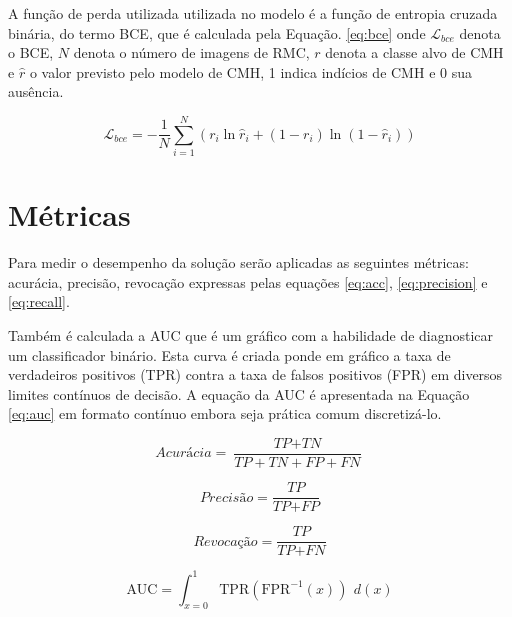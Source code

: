 A função de perda utilizada utilizada no modelo é a função de entropia cruzada binária, do termo  \gls{BCE}, que é calculada pela Equação. \ref{eq:bce} onde $\mathcal{L}_{bce}$ denota o \gls{BCE}, $N$ denota o número de imagens de \gls{RMC}, $r$ denota a classe alvo de \gls{CMH} e $\hat{r}$ o valor previsto pelo modelo de \gls{CMH}, 1 indica indícios de \gls{CMH} e 0 sua ausência.

\begin{equation}
\mathcal{L}_{bce} = -\frac{1}{N} \sum_{i=1}^N
(r_i \ln \hat{r}_i + (1 - r_i) \ln (1 - \hat{r}_i))
\label{eq:bce}
\end{equation}

\section{Métricas}
\label{subsec:cap4_metrics}
Para medir o desempenho da solução serão aplicadas as seguintes métricas: acurácia, precisão, revocação expressas pelas equações \ref{eq:acc}, \ref{eq:precision} e \ref{eq:recall}.

Também é calculada a \gls{AUC} que é um gráfico com a habilidade de diagnosticar um classificador binário. Esta curva é criada ponde em gráfico a taxa de verdadeiros positivos (TPR) contra a taxa de falsos positivos (FPR) em diversos limites contínuos de decisão. A equação da \gls{AUC} é apresentada na Equação \ref{eq:auc} em formato contínuo embora seja prática comum discretizá-lo.


\begin{equation}
  \textit{Acurácia} = \frac{\textit{TP} + \textit{TN}}{\textit{TP} + \textit{TN} + \textit{FP} + \textit{FN}}
  \label{eq:acc}
\end{equation}

\begin{equation}
  \textit{Precisão} = \frac{\textit{TP}}{\textit{TP} + \textit{FP}}
  \label{eq:precision}
\end{equation}

\begin{equation}
  \textit{Revocação} = \frac{\textit{TP}}{\textit{TP} + \textit{FN}}
  \label{eq:recall}
\end{equation}

\begin{equation}
  \text{AUC} = \int_{x=0}^{1} \text{TPR}(\text{FPR}^{-1}(x)) \ \, d(x)
  \label{eq:auc}
\end{equation}


